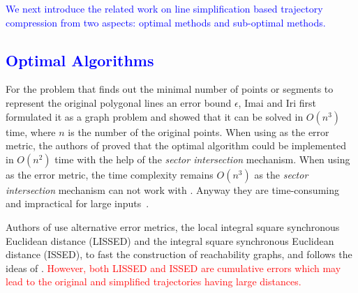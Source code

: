 \textcolor{blue}{We next introduce the related work on line simplification based trajectory compression from two aspects: optimal methods and sub-optimal methods.}


\subsection{\textcolor{blue}{Optimal Algorithms}}
For the problem that finds out the minimal number of points or segments to represent the original polygonal lines \wrt an error bound $\epsilon$, Imai and Iri  first formulated it as a graph problem and showed that it can be solved in  $O(n^3)$ time, where $n$ is the number of the original points\cite{Imai:Optimal}.
When using \ped as the error metric, the authors of \cite{Chan:Optimal} proved that the optimal algorithm could be implemented in $O(n^2)$ time with the help of the \textit{sector intersection} mechanism. 
When using \sed as the error metric, the time complexity remains $O(n^3)$ as the \textit{sector intersection} mechanism can not work with \sed. Anyway
they are time-consuming and impractical for large inputs~\cite{Heckbert:Survey}. 

Authors of \cite{Chen:Fast} use alternative error metrics, \ie the local integral square synchronous Euclidean distance (LISSED) and the integral square synchronous Euclidean distance (ISSED), to fast the construction of reachability graphs, and \cite{Wu:Graph} follows the ideas of \cite{Chen:Fast}. 
\textcolor{red}{However, both LISSED and ISSED are cumulative errors which may lead to the original and simplified trajectories having large distances.}

%

